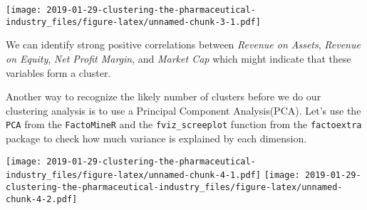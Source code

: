 \documentclass[]{article}
\newenvironment{Shaded}{\begin{snugshade}}{\end{snugshade}}
\newcommand{\KeywordTok}[1]{\textcolor[rgb]{0.13,0.29,0.53}{\textbf{#1}}}
\newcommand{\DataTypeTok}[1]{\textcolor[rgb]{0.13,0.29,0.53}{#1}}
\newcommand{\DecValTok}[1]{\textcolor[rgb]{0.00,0.00,0.81}{#1}}
\newcommand{\StringTok}[1]{\textcolor[rgb]{0.31,0.60,0.02}{#1}}
\newcommand{\CommentTok}[1]{\textcolor[rgb]{0.56,0.35,0.01}{\textit{#1}}}
\newcommand{\OperatorTok}[1]{\textcolor[rgb]{0.81,0.36,0.00}{\textbf{#1}}}
\newcommand{\NormalTok}[1]{#1}
\begin{document}
\texttt{[image: 2019-01-29-clustering-the-pharmaceutical-industry\_files/figure-latex/unnamed-chunk-3-1.pdf]}

We can identify strong positive correlations between \emph{Revenue on
Assets}, \emph{Revenue on Equity}, \emph{Net Profit Margin}, and
\emph{Market Cap} which might indicate that these variables form a
cluster.

Another way to recognize the likely number of clusters before we do our
clustering analysis is to use a Principal Component Analysis(PCA). Let's
use the \texttt{PCA} from the \texttt{FactoMineR} and the
\texttt{fviz\_screeplot} function from the \texttt{factoextra} package
to check how much variance is explained by each dimension.

\begin{Shaded}
\end{Shaded}

\texttt{[image: 2019-01-29-clustering-the-pharmaceutical-industry\_files/figure-latex/unnamed-chunk-4-1.pdf]}
\texttt{[image: 2019-01-29-clustering-the-pharmaceutical-industry\_files/figure-latex/unnamed-chunk-4-2.pdf]}

\begin{Shaded}
\end{Shaded}
\end{document}

